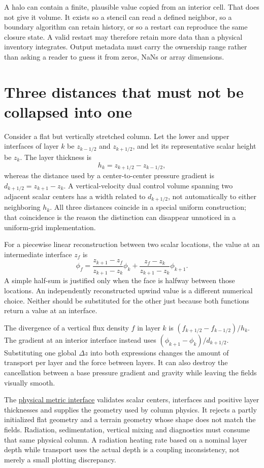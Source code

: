 A halo can contain a finite, plausible value copied from an interior cell.
That does not give it volume. It exists so a stencil can read a defined neighbor,
so a boundary algorithm can retain history, or so a restart can reproduce the
same closure state. A valid restart may therefore retain more data than a
physical inventory integrates. Output metadata must carry the ownership range
rather than asking a reader to guess it from zeros, NaNs or array dimensions.

\section{Three distances that must not be collapsed into one}

Consider a flat but vertically stretched column. Let the lower and upper
interfaces of layer $k$ be $z_{k-1/2}$ and $z_{k+1/2}$, and let its representative
scalar height be $z_k$. The layer thickness is
\[
 h_k=z_{k+1/2}-z_{k-1/2},
\]
whereas the distance used by a center-to-center pressure gradient is
$d_{k+1/2}=z_{k+1}-z_k$. A vertical-velocity dual control volume spanning two
adjacent scalar centers has a width related to $d_{k+1/2}$, not automatically
to either neighboring $h_k$. All three distances coincide in a special uniform
construction; that coincidence is the reason the distinction can disappear
unnoticed in a uniform-grid implementation.

For a piecewise linear reconstruction between two scalar locations, the value
at an intermediate interface $z_f$ is
\[
 \phi_f=\frac{z_{k+1}-z_f}{z_{k+1}-z_k}\phi_k
       +\frac{z_f-z_k}{z_{k+1}-z_k}\phi_{k+1}.
\]
A simple half-sum is justified only when the face is halfway between those
locations. An independently reconstructed upwind value is a different numerical
choice. Neither should be substituted for the other just because both functions
return a value at an interface.

The divergence of a vertical flux density $f$ in layer $k$ is
$(f_{k+1/2}-f_{k-1/2})/h_k$. The gradient at an interior interface instead uses
$(\phi_{k+1}-\phi_k)/d_{k+1/2}$. Substituting one global $\Delta z$ into both
expressions changes the amount of transport per layer and the force between
layers. It can also destroy the cancellation between a base pressure gradient
and gravity while leaving the fields visually smooth.

The \href{../include/core/infra/physical_grid_metrics.hpp}{physical metric
interface} validates scalar centers, interfaces and positive layer thicknesses
and supplies the geometry used by column physics. It rejects a partly initialized
flat geometry and a terrain geometry whose shape does not match the fields.
Radiation, sedimentation, vertical mixing and diagnostics must consume that
same physical column. A radiation heating rate based on a nominal layer depth
while transport uses the actual depth is a coupling inconsistency, not merely
a small plotting discrepancy.

